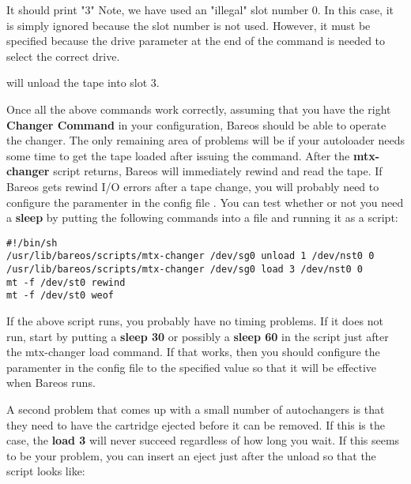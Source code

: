 
It should print "3"
Note, we have used an "illegal" slot number 0. In this case, it is simply
ignored because the slot number is not used.  However, it must be specified
because the drive parameter at the end of the command is needed to select
the correct drive.


will unload the tape into slot 3.


Once all the above commands work correctly, assuming that you have the right
{\bf Changer Command} in your configuration, Bareos should be able to operate
the changer. The only remaining area of problems will be if your autoloader
needs some time to get the tape loaded after issuing the command. After the
{\bf mtx-changer} script returns, Bareos will immediately rewind and read the
tape. If Bareos gets rewind I/O errors after a tape change, you will probably
need to configure the  paramenter in the config file .
You can test whether or not you need a {\bf sleep} by putting the following
commands into a file and running it as a script:

\footnotesize
\begin{verbatim}
#!/bin/sh
/usr/lib/bareos/scripts/mtx-changer /dev/sg0 unload 1 /dev/nst0 0
/usr/lib/bareos/scripts/mtx-changer /dev/sg0 load 3 /dev/nst0 0
mt -f /dev/st0 rewind
mt -f /dev/st0 weof
\end{verbatim}
\normalsize

If the above script runs, you probably have no timing problems. If it does not
run, start by putting a {\bf sleep 30} or possibly a {\bf sleep 60} in the
script just after the mtx-changer load command. If that works, then you should
configure the  paramenter in the config file  to the specified value  so that it will be
effective when Bareos runs.

A second problem that comes up with a small number of autochangers is that
they need to have the cartridge ejected before it can be removed. If this is
the case, the {\bf load 3} will never succeed regardless of how long you wait.
If this seems to be your problem, you can insert an eject just after the
unload so that the script looks like:

